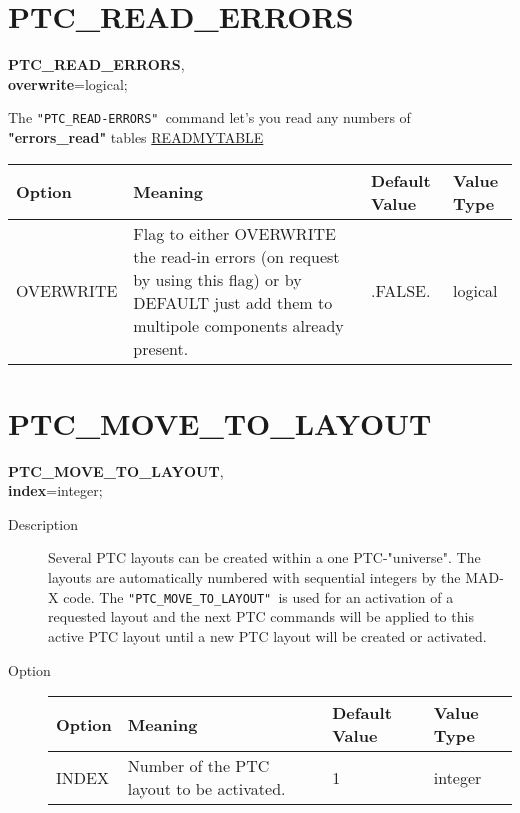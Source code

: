 \section{PTC\_READ\_ERRORS}

\begin{description}
   \item {
     \textbf{PTC\_READ\_ERRORS}, \\ 
     \textbf{overwrite}=logical;} 
     \item[Description] The \texttt{"PTC\_READ-ERRORS" }command let's
       you read any numbers of  \textbf{"errors\_read"} tables
       \href{../control/general.html#readmytable}{READMYTABLE} 
     \item[Options] 	
       \begin{tabular}{l p{6cm} p{1.5cm} p{1.5cm}}
         \hline 
         \textbf{Option} & \textbf{Meaning} & \textbf{Default Value} &
         \textbf{Value Type} \\  
         \hline
         OVERWRITE & 
         Flag to either OVERWRITE the read-in errors (on request by
         using this flag) or by DEFAULT just add them to multipole
         components already present.   & .FALSE. & logical \\  
         \hline
       \end{tabular}
       
     \item[Remarks] 
\end{description}

\section{PTC\_MOVE\_TO\_LAYOUT}


\begin{description}
     \item {\textbf{PTC\_MOVE\_TO\_LAYOUT}, \\ \textbf{index}=integer;}
\end{description}

\begin{description}
   \item[Description]  Several PTC layouts can be created within a one
     PTC-"universe".  The layouts are automatically numbered with
     sequential integers  by the MAD-X code. The
     \texttt{"PTC\_MOVE\_TO\_LAYOUT" }is used for an activation 
     of a requested  layout and the next PTC commands will be applied to
     this active  PTC layout until a new PTC layout will be created or
     activated. 
   \item[Option]
     \begin{tabular}{l p{6cm} p{1.5cm} p{1.5cm}}
       \hline 
       \textbf{Option} & \textbf{Meaning} & \textbf{Default Value} &
       \textbf{Value Type} \\
       \hline
       INDEX & Number of the PTC layout to be activated. & 1 & integer \\ 
       \hline
     \end{tabular}
\end{description}

